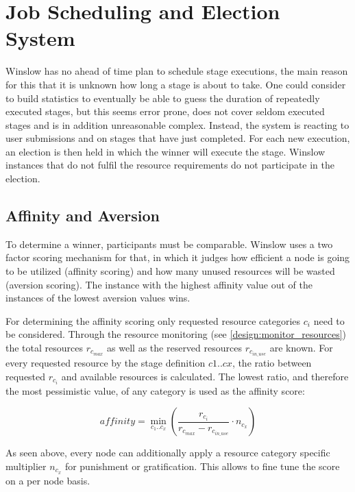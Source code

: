 \section{Job Scheduling and Election System}
\label{design:election}

Winslow has no ahead of time plan to schedule stage executions, the main reason for this that it is unknown how long a stage is about to take.
One could consider to build statistics to eventually be able to guess the duration of repeatedly executed stages, but this seems error prone, does not cover seldom executed stages and is in addition unreasonable complex.
Instead, the system is reacting to user submissions and on stages that have just completed.
For each new execution, an election is then held in which the winner will execute the stage.
Winslow instances that do not fulfil the resource requirements do not participate in the election.

\subsection{Affinity and Aversion}
\label{election:affinity_and_aversion}

To determine a winner, participants must be comparable.
Winslow uses a two factor scoring mechanism for that, in which it judges how efficient a node is going to be utilized (affinity scoring) and how many unused resources will be wasted (aversion scoring).
The instance with the highest affinity value out of the instances of the lowest aversion values wins.

For determining the affinity scoring only requested resource categories $c_i$ need to be considered.
Through the resource monitoring (see \autoref{design:monitor_resources}) the total resources $r_{c_{max}}$ as well as the reserved resources $r_{c_{in\_use}}$ are known.
For every requested resource by the stage definition $c1 .. cx$, the ratio between requested $r_{c_i}$ and available resources is calculated.
The lowest ratio, and therefore the most pessimistic value, of any category is used as the affinity score:

\begin{equation}
	\label{election:eq:affinity}
	{affinity} = \min_{c_1 .. c_x} \left( \frac{r_{c_i}}{r_{c_{max}} - r_{c_{in\_use}}} \cdot n_{c_x} \right)
\end{equation}

As seen above, every node can additionally apply a resource category specific multiplier $n_{c_x}$ for punishment or gratification.
This allows to fine tune the score on a per node basis.

